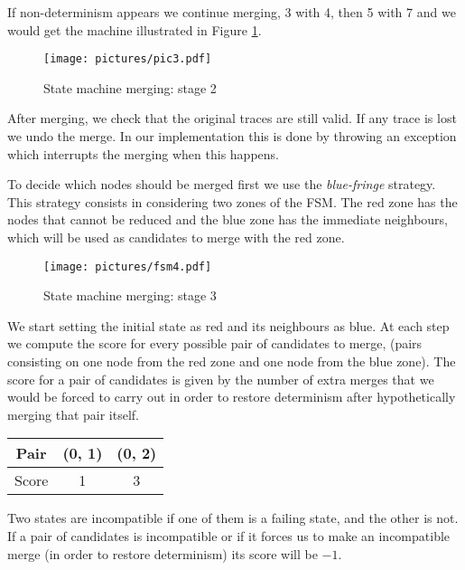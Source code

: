 \documentclass[]{sigplanconf}
\begin{document}
If non-determinism appears we continue merging, 3 with 4, then
5 with 7 and we would get the machine illustrated in Figure \ref{fsm3}.

\begin{figure}
\begin{center}
\texttt{[image: pictures/pic3.pdf]}
\end{center}
\caption{State machine merging: stage 2}
\label{fsm3}
\end{figure}

After merging, we check that the original traces are still
valid. If any trace is lost we undo the merge. In our implementation
this is done by throwing an exception which interrupts the merging
when this happens.

To decide which nodes should be merged first we use the \emph{
blue-fringe} strategy. This strategy consists in considering two zones of the
FSM. The red zone has the nodes that cannot be reduced
and the blue zone has the immediate neighbours, which will
be used as candidates to merge with the red zone.

\begin{figure}
\begin{center}
\texttt{[image: pictures/fsm4.pdf]}
\end{center}
\caption{State machine merging: stage 3}
\label{fsm4}
\end{figure}


We start setting the initial state as red and its neighbours as blue.
At each step we compute the score for every possible pair of candidates
to merge, (pairs consisting on one node from the red zone and one node from the blue zone).
The score for a pair of candidates is given by the number of extra
merges that we would be forced to carry out in order to restore determinism after
hypothetically merging that pair itself.

\begin{center}
\begin{tabular}{c||c|c}
Pair & (0, 1) & (0, 2)\\\hline\hline
Score & 1 & 3
\end{tabular}
\end{center}

Two states are incompatible if one of them is a failing state, and
the other is not. If a pair of candidates is incompatible or if
it forces us to make an incompatible merge (in order to restore determinism)
its score will be $-1$.
\end{document}
